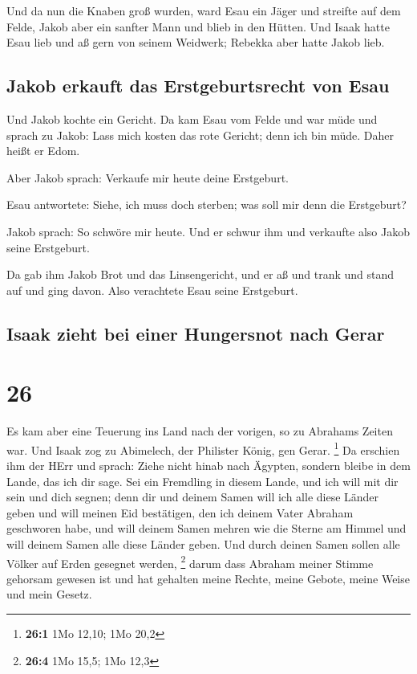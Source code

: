  Und da nun die Knaben groß wurden, ward Esau ein Jäger
und streifte auf dem Felde, Jakob aber ein sanfter Mann und blieb in den
Hütten.  Und Isaak hatte Esau lieb und aß gern von seinem
Weidwerk; Rebekka aber hatte Jakob lieb.

\hypertarget{jakob-erkauft-das-erstgeburtsrecht-von-esau}{%
\subsection{Jakob erkauft das Erstgeburtsrecht von
Esau}\label{jakob-erkauft-das-erstgeburtsrecht-von-esau}}

 Und Jakob kochte ein Gericht. Da kam Esau vom Felde und
war müde  und sprach zu Jakob: Lass mich kosten das rote
Gericht; denn ich bin müde. Daher heißt er Edom.

 Aber Jakob sprach: Verkaufe mir heute deine Erstgeburt.

 Esau antwortete: Siehe, ich muss doch sterben; was soll
mir denn die Erstgeburt?

 Jakob sprach: So schwöre mir heute. Und er schwur ihm
und verkaufte also Jakob seine Erstgeburt.

 Da gab ihm Jakob Brot und das Linsengericht, und er aß
und trank und stand auf und ging davon. Also verachtete Esau seine
Erstgeburt.

\hypertarget{isaak-zieht-bei-einer-hungersnot-nach-gerar}{%
\subsection{Isaak zieht bei einer Hungersnot nach
Gerar}\label{isaak-zieht-bei-einer-hungersnot-nach-gerar}}

\hypertarget{section-25}{%
\section{26}\label{section-25}}

 Es kam aber eine Teuerung ins Land nach der vorigen, so
zu Abrahams Zeiten war. Und Isaak zog zu Abimelech, der Philister König,
gen Gerar. \footnote{\textbf{26:1} 1Mo 12,10; 1Mo 20,2} 
Da erschien ihm der HErr und sprach: Ziehe nicht hinab nach Ägypten,
sondern bleibe in dem Lande, das ich dir sage.  Sei ein
Fremdling in diesem Lande, und ich will mit dir sein und dich segnen;
denn dir und deinem Samen will ich alle diese Länder geben und will
meinen Eid bestätigen, den ich deinem Vater Abraham geschworen habe,
 und will deinem Samen mehren wie die Sterne am Himmel und
will deinem Samen alle diese Länder geben. Und durch deinen Samen sollen
alle Völker auf Erden gesegnet werden, \footnote{\textbf{26:4} 1Mo 15,5;
  1Mo 12,3}  darum dass Abraham meiner Stimme gehorsam
gewesen ist und hat gehalten meine Rechte, meine Gebote, meine Weise und
mein Gesetz.

